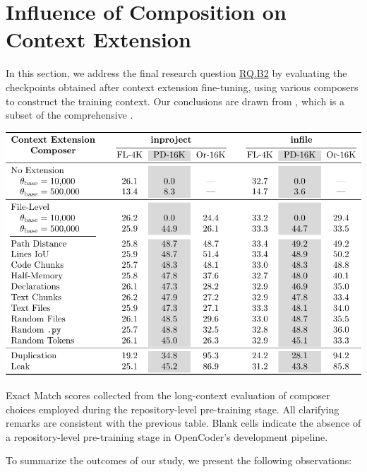 \section{Influence of Composition on Context Extension}\label{sec:influence-of-composition-on-context-extension}

In this section, we address the final research question \hyperref[rq:rq-b2]{RQ.B2} by evaluating the checkpoints obtained after context extension fine-tuning, using various composers to construct the training context. Our conclusions are drawn from , which is a subset of the comprehensive .

\begin{table}[htbp]
    \centering
    \includegraphics[width=\textwidth]{tables/rq-b2.pdf}
    \caption{Exact Match scores collected from the long-context evaluation of composer choices employed during the repository-level pre-training stage. All clarifying remarks are consistent with the previous table. Blank cells indicate the absence of a repository-level pre-training stage in OpenCoder's development pipeline.}\label{tab:ocoder-extension}
\end{table}

To summarize the outcomes of our study, we present the following observations:

